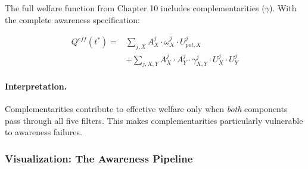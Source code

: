 The full welfare function from Chapter 10 includes complementarities ($\gamma$).
With the complete awareness specification:

\begin{align}
Q^{eff}(t^*) = & \sum_{j,X} A^j_X \cdot \omega^j_X \cdot U^j_{pot,X} \nonumber \\
& + \sum_{j,X,Y} A^j_X \cdot A^j_Y \cdot \gamma^j_{X,Y} \cdot U^j_X \cdot U^j_Y
\end{align}

\paragraph{Interpretation.}
Complementarities contribute to effective welfare only when \emph{both} 
components pass through all five filters. This makes complementarities 
particularly vulnerable to awareness failures.

\subsubsection{Visualization: The Awareness Pipeline}
\label{subsubsec:visualization}

